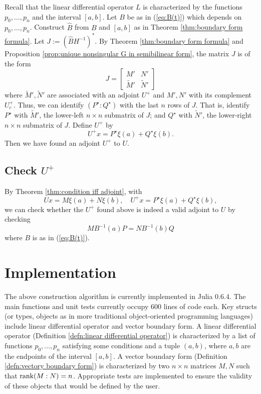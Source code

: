 \documentclass[11pt, oneside, a4paper]{article}
\begin{document}
Recall that the linear differential operator $L$ is characterized by the functions $p_0,\ldots,p_n$ and the interval $[a,b]$. Let $B$ be as in (\ref{eq:B(t)}) which depends on $p_0,\ldots,p_n$. Construct $\hat{B}$ from $B$ and $[a,b]$ as in Theorem \ref{thm:boundary form formula}. Let $J:=(\hat{B}H^{-1})^*$. By Theorem \ref{thm:boundary form formula} and Proposition \ref{prop:unique nonsingular G in semibilinear form}, the matrix $J$ is of the form
\[J=\begin{bmatrix}M' & N'\\ \tilde{M}' & \tilde{N}'\end{bmatrix}\]
where $\tilde{M}', \tilde{N}'$ are associated with an adjoint $U^+$ and $M', N'$ with its complement $U_c^+$.
Thus, we can identify $(P^\star:Q^\star)$ with the last $n$ rows of $J$. That is, identify $P^\star$ with $\tilde{M}'$, the lower-left $n\times n$ submatrix of $J$; and $Q^\star$ with $\tilde{N}'$, the lower-right $n\times n$ submatrix of $J$. Define $U^+$ by
\[U^+x = P^\star \xi(a) + Q^\star \xi(b).\]
Then we have found an adjoint $U^+$ to $U$.

\subsection{Check $U^+$}
By Theorem \ref{thm:condition iff adjoint}, with
\[Ux = M\xi(a) + N\xi(b),\quad U^+x = P^\star \xi(a) + Q^\star \xi(b),\]
we can check whether the $U^+$ found above is indeed a valid adjoint to $U$ by checking 
\[MB^{-1}(a)P = NB^{-1}(b)Q\]
where $B$ is as in (\ref{eq:B(t)}).

\section{Implementation}
The above construction algorithm is currently implemented in Julia 0.6.4. The main functions and unit tests currently occupy $600$ lines of code each. Key structs (or types, objects as in more traditional object-oriented programming languages) include linear differential operator and vector boundary form. A linear differential operator (Definition \ref{defn:linear differential operator}) is characterized by a list of functions $p_0,\ldots, p_n$ satisfying some conditions and a tuple $(a,b)$, where $a, b$ are the endpoints of the interval $[a,b]$. A vector boundary form (Definition \ref{defn:vectory boundary form}) is characterized by two $n\times n$ matrices $M, N$ such that $\operatorname{rank}(M:N)=n$. Appropriate tests are implemented to ensure the validity of these objects that would be defined by the user.
\end{document}
